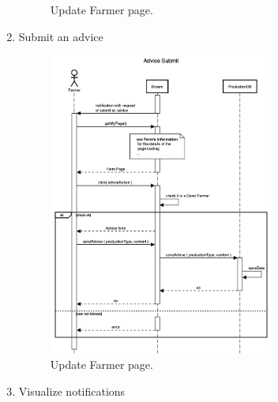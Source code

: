 \documentclass{article}
\begin{document}
\begin{enumerate}
\begin{figure}[H]
\begin{center}
        \caption{Update Farmer page.}
        \label{fig:state1}
        \end{center}
    \end{figure}
    \item Submit an advice
    \begin{figure}[H]
        \begin{center}
        \includegraphics[width=0.7\textwidth]{sequence/AdviceSubmit.png}
        \caption{Update Farmer page.}
        \label{fig:state1}
        \end{center}
    \end{figure}
    \item Visualize notifications
    \begin{figure}[H]
        \begin{center}

\end{center}
\end{figure}
\end{enumerate}
\end{document}
